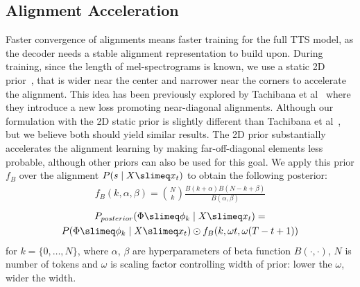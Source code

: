  
\subsection{Alignment Acceleration}
\label{sec:accelerating_alignments}
Faster convergence of alignments means faster training for the full TTS model, as the decoder needs a stable alignment representation to build upon. During training, since the length of mel-spectrograms is known, we use a static 2D prior~\cite{rad_tts}, that is wider near the center and narrower near the corners to accelerate the alignment. This idea has been previously explored by Tachibana et al~\cite{guidedloss} where they introduce a new loss promoting near-diagonal alignments. Although our formulation with the 2D static prior is slightly different than Tachibana et al~\cite{guidedloss}, but we believe both should yield similar results. The 2D prior substantially accelerates the alignment learning by making far-off-diagonal elements less probable, although other priors can also be used for this goal. We apply this prior $f_{B}$ over the alignment $P(s \mid X \slimeq x_t)$ to obtain the following posterior:
 \begin{multline}
     f_{B}(k, \alpha, \beta) = {N \choose k} \frac{B(k + \alpha)B(N-k+\beta)}{B(\alpha, \beta)} 
 \end{multline}
 \begin{multline}
 P_{posterior}(\Phi \slimeq \phi_{k} \mid X\slimeq x_t)=\\
     P(\Phi \slimeq \phi_{k} \mid X\slimeq x_t) \odot f_{B}(k, \omega  t,  \omega  (T-t+1))
\end{multline}
 for $k=\{0,\ldots,N\}$, where $\alpha$, $\beta$ are hyperparameters of beta function $B(\cdot, \cdot)$, $N$ is number of tokens and $\omega$ is scaling factor controlling width of prior: lower the $\omega$, wider the width. 